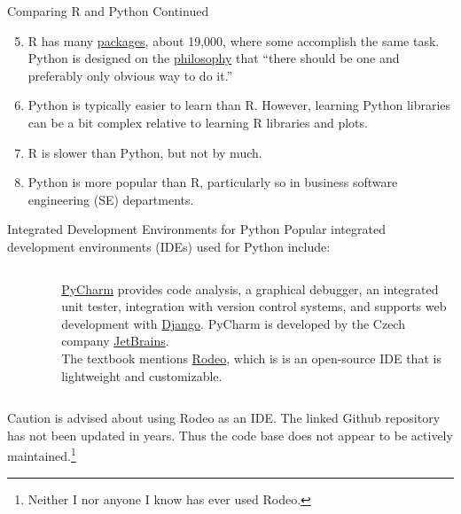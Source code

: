 \documentclass[pdf]{beamer}
\theoremstyle{remark}
\theoremstyle{definition}
\begin{document}
 \begin{frame}[t]{Comparing R and Python Continued}
 \begin{enumerate}
 \setcounter{enumi}{4}
   \item R has many \href{https://cran.r-project.org/}{packages}, about 19,000, where some accomplish the same task.  Python is designed on the \href{https://peps.python.org/pep-0020/}{philosophy} that ``there should be one and preferably only obvious way to do it.'' 
  \item Python is typically easier to learn than R.  However, learning Python libraries can be a bit complex relative to learning R libraries and plots.
  \item R is slower than Python, but not by much.
  \item Python is more popular than R, particularly so in business software engineering (SE) departments.
\end{enumerate}
\end{frame}

\begin{frame}[t]{Integrated Development Environments for Python}
Popular integrated development environments (IDEs) used for Python include: \\
\vspace{1.5ex}
\begin{columns}[T]
\begin{column}{0.2\textwidth}
\begin{figure}[htbp]
  \captionsetup{justification=centering}
  \includegraphics[height=1.2cm, trim=0.1cm 0.1cm 0.1cm 0.1cm width=1.2cm]{Images/PyCharm.jpg}
\end{figure}
\end{column}
\begin{column}{0.7\textwidth}  %
\href{https://www.jetbrains.com/pycharm/}{PyCharm} provides code analysis, a graphical debugger, an integrated unit tester, integration with version control systems, and supports web development with \href{https://www.djangoproject.com/}{Django}. PyCharm is developed by the Czech company \href{https://www.jetbrains.com/}{JetBrains}. \\
\vspace{1.5ex}
The textbook mentions \href{https://github.com/yhat/rodeo}{Rodeo}, which is is an open-source IDE that is lightweight and customizable. 
\end{column}
\end{columns}
\vspace{1.5ex}
Caution is advised about using Rodeo as an IDE.  The linked Github repository has not been updated in years.  Thus the code base does not appear to be actively maintained.\footnote{Neither I nor anyone I know has ever used Rodeo.}
\end{frame}
\end{document}
